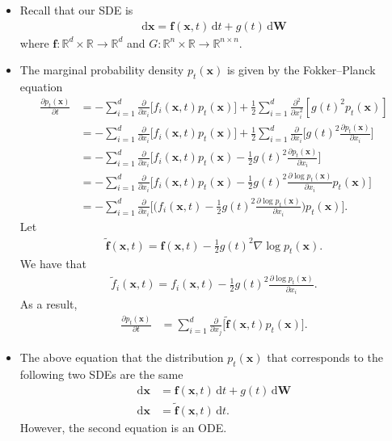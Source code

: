 \documentclass[10pt]{article}
\newcommand{\dee}{\mathrm{d}}
\newcommand{\ve}[1]{\mathbf{#1}}
\newcommand{\Real}{\mathbb{R}}
\begin{document}
\begin{itemize}
  \item Recall that our SDE is 
  \begin{align*}
    \dee\ve{x} = \ve{f}(\ve{x},t)\, \dee t + g(t)\, \dee\ve{W}
  \end{align*}
  where $\ve{f}: \Real^d \times \Real \rightarrow \Real^d$ and $G: \Real^n \times \Real \rightarrow \Real^{n \times n}$.

  \item The marginal probability density $p_t(\ve{x})$ is given by the Fokker--Planck equation
  \begin{align*}
    \frac{\partial p_t(\ve{x})}{\partial t}
    &= - \sum_{i=1}^d \frac{\partial}{\partial x_i} \Big[ f_i(\ve{x},t)p_t(\ve{x}) \Big] + \frac{1}{2} \sum_{i=1}^d \frac{\partial^2 }{\partial x_i^2} [g(t)^2p_t(\ve{x})] \\
    &= - \sum_{i=1}^d \frac{\partial}{\partial x_i} \Big[ f_i(\ve{x},t)p_t(\ve{x}) \Big] + \frac{1}{2} \sum_{i=1}^d \frac{\partial}{\partial x_i} \bigg[ g(t)^2 \frac{\partial p_t(\ve{x})}{\partial x_i} \bigg] \\
    &= - \sum_{i=1}^d \frac{\partial}{\partial x_i} \bigg[ f_i(\ve{x},t)p_t(\ve{x}) - \frac{1}{2} g(t)^2 \frac{\partial p_t(\ve{x})}{\partial x_i} \bigg] \\
    &= - \sum_{i=1}^d \frac{\partial}{\partial x_i} \bigg[ f_i(\ve{x},t)p_t(\ve{x}) - \frac{1}{2} g(t)^2 \frac{\partial \log p_t(\ve{x})}{\partial x_i} p_t(\ve{x}) \bigg] \\
    &= - \sum_{i=1}^d \frac{\partial}{\partial x_i} \bigg[ \bigg(f_i(\ve{x},t) - \frac{1}{2} g(t)^2 \frac{\partial \log p_t(\ve{x})}{\partial x_i} \bigg) p_t(\ve{x}) \bigg].    
  \end{align*}
  Let
  \begin{align*}
    \widetilde{\ve{f}}(\ve{x}, t) = \ve{f}(\ve{x},t) - \frac{1}{2} g(t)^2 \nabla \log p_t(\ve{x}).
  \end{align*}
  We have that
  \begin{align*}
    \widetilde{f}_i(\ve{x},t) = f_i(\ve{x},t) - \frac{1}{2} g(t)^2 \frac{\partial \log p_t(\ve{x})}{\partial x_i}.
  \end{align*}
  As a result,
  \begin{align*}
    \frac{\partial p_t(\ve{x})}{\partial t} &= \sum_{i=1}^d \frac{\partial}{\partial x_j} \Big[\widetilde{\ve{f}}(\ve{x},t) p_t(\ve{x}) \Big].
  \end{align*}

  \item The above equation that the distribution $p_t(\ve{x})$ that corresponds to the following two SDEs are the same
  \begin{align*}
    \dee \ve{x} &= \ve{f}(\ve{x},t)\, \dee t + g(t)\, \dee\ve{W} \\
    \dee \ve{x} &= \widetilde{\ve{f}}(\ve{x},t) \, \dee t.
  \end{align*}
  However, the second equation is an ODE.


\end{itemize}
\end{document}
